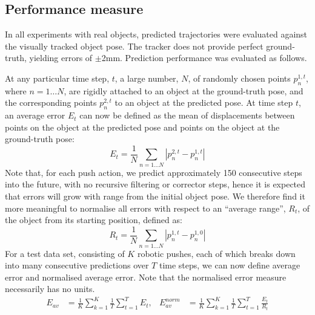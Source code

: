 \subsection{Performance measure}\label{sec:Experiment.Performance}

In all experiments with real objects, predicted trajectories were evaluated against the visually tracked object pose. The tracker does not provide perfect ground-truth, yielding errors of $\pm$2mm. Prediction performance was evaluated as follows.

At any particular time step, $t$, a large number, $N$, of randomly chosen points $p_{n}^{1,t}$, where $n=1 \ldots N$, are rigidly attached to an object at the ground-truth pose, and the corresponding points $p_{n}^{2,t}$ to an object at the predicted pose. At time step $t$, an average error $E_t$ can now be defined as the mean of displacements between points on the object at the predicted pose and points on the object at the ground-truth pose:
\begin{equation}
E_t = \frac{1}{N} \mathop{\sum}_{n=1 \ldots N}|p_{n}^{2,t}-p_{n}^{1,t}|
\label{eq:defn_Rt}
\end{equation}
Note that, for each push action, we predict approximately 150
consecutive steps into the future, with no recursive filtering or
corrector steps, hence it is expected that errors will grow with range
from the initial object pose. We therefore find it more meaningful to
normalise all errors with respect to an ``average range'', $R_t$, of
the object from its starting position, defined as:
\begin{equation}
R_t = \frac{1}{N} \mathop{\sum}_{n=1 \ldots N}|p_{n}^{1,t}-p_{n}^{1,0}|
\label{eq:defn_Et}
\end{equation}
For a test data set, consisting of $K$ robotic pushes, each of which breaks down into many consecutive predictions over $T$ time steps, we can now define average error and normalised average error. Note that the normalised error measure necessarily has no units.
\begin{align}
E_{av} &= \frac{1}{K} \mathop{\sum}_{k=1}^{K} \frac{1}{T} \mathop{\sum}_{t=1}^{T} E_t,
&E_{av}^{norm} &= \frac{1}{K} \mathop{\sum}_{k=1}^{K} \frac{1}{T} \mathop{\sum}_{t=1}^{T} \frac{E_t}{R_t}
\label{eq:Error1}
\end{align}


